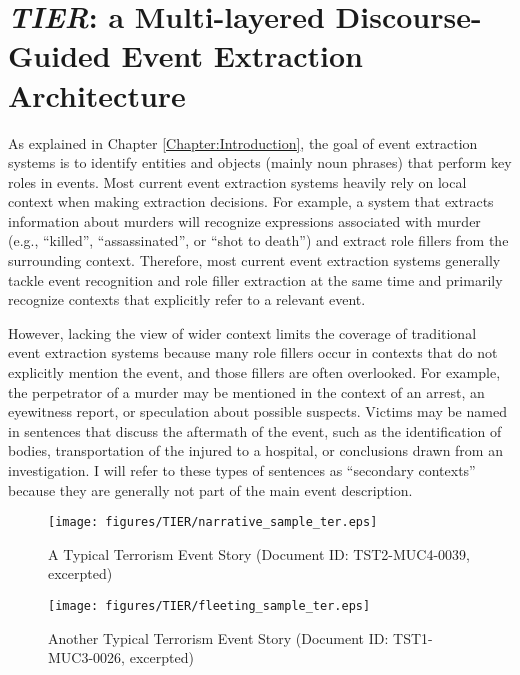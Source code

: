 \chapter{{\it TIER}: a Multi-layered Discourse-Guided Event Extraction Architecture}
\label{Chapter:TIER}
As explained in Chapter \ref{Chapter:Introduction}, the goal of event extraction systems is to identify 
entities and objects (mainly noun phrases) that perform key roles 
in events. 
Most current event extraction systems 
heavily rely on local context
when making extraction decisions. 
For example, a system that extracts information
 about murders will recognize expressions associated with murder
 (e.g., ``killed'', ``assassinated'', or ``shot to death'') and
 extract role fillers from the surrounding context. 
Therefore, most current event extraction systems generally tackle event recognition and role
 filler extraction at the same time and primarily recognize contexts that explicitly refer
 to a relevant event.
 
However, lacking the view of wider context limits the 
coverage of traditional event extraction systems 
because many role
 fillers occur in contexts that do not explicitly mention the event,
 and those fillers are often overlooked. 
For example, the perpetrator
 of a murder may be mentioned in the context of an arrest, an
 eyewitness report, or speculation about possible suspects. Victims
 may be named in sentences that discuss the aftermath of the event,
 such as the identification of bodies, transportation of the injured
 to a hospital, or conclusions drawn from an investigation.  I will
 refer to these types of sentences as ``secondary contexts'' because
 they are generally not part of the main event description. 
 \begin{figure}[h]
 \centering
 \texttt{[image: figures/TIER/narrative\_sample\_ter.eps]}
 \caption{A Typical Terrorism Event Story (Document ID: TST2-MUC4-0039, excerpted)}
\label{narrative_sample}
\end{figure} 

  \begin{figure}[h]
 \centering
 \texttt{[image: figures/TIER/fleeting\_sample\_ter.eps]}
 \caption{Another Typical Terrorism Event Story (Document ID: TST1-MUC3-0026, excerpted)}
\label{fleeting_sample}
\end{figure} 

